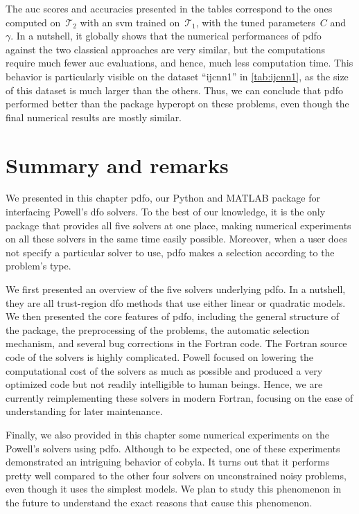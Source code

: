 The \gls{auc} scores and accuracies presented in the tables correspond to the ones computed on~$\mathcal{T}_2$ with an \gls{svm} trained on~$\mathcal{T}_1$, with the tuned parameters~$C$ and~$\gamma$.
In a nutshell, it globally shows that the numerical performances of \gls{pdfo} against the two classical approaches are very similar, but the computations require much fewer \gls{auc} evaluations, and hence, much less computation time.
This behavior is particularly visible on the dataset \enquote{ijcnn1} in \cref{tab:ijcnn1}, as the size of this dataset is much larger than the others.
Thus, we can conclude that \gls{pdfo} performed better than the package hyperopt on these problems, even though the final numerical results are mostly similar.

\section{Summary and remarks}

We presented in this chapter \gls{pdfo}, our Python and MATLAB package for interfacing Powell's \gls{dfo} solvers.
To the best of our knowledge, it is the only package that provides all five solvers at one place, making numerical experiments on all these solvers in the same time easily possible.
Moreover, when a user does not specify a particular solver to use, \gls{pdfo} makes a selection according to the problem's type.

We first presented an overview of the five solvers underlying \gls{pdfo}.
In a nutshell, they are all trust-region \gls{dfo} methods that use either linear or quadratic models.
We then presented the core features of \gls{pdfo}, including the general structure of the package, the preprocessing of the problems, the automatic selection mechanism, and several bug corrections in the Fortran code.
The Fortran source code of the solvers is highly complicated.
Powell focused on lowering the computational cost of the solvers as much as possible and produced a very optimized code but not readily intelligible to human beings.
Hence, we are currently reimplementing these solvers in modern Fortran, focusing on the ease of understanding for later maintenance.

Finally, we also provided in this chapter some numerical experiments on the Powell's solvers using \gls{pdfo}.
Although to be expected, one of these experiments demonstrated an intriguing behavior of \gls{cobyla}.
It turns out that it performs pretty well compared to the other four solvers on unconstrained noisy problems, even though it uses the simplest models.
We plan to study this phenomenon in the future to understand the exact reasons that cause this phenomenon.
